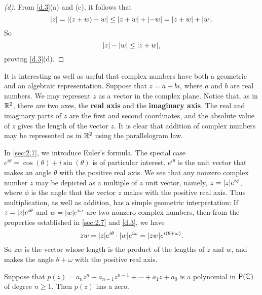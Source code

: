 \begin{proof}[(d)]
	From \cref{d.3}(a) and (c), it follows that
	\[
		\abs{z} = \abs{(z + w) - w} \leq \abs{z + w} + \abs{-w} = \abs{z + w} + \abs{w}.
	\]
	So
	\[
		\abs{z} - \abs{w} \leq \abs{z + w},
	\]
	proving \cref{d.3}(d).
\end{proof}

\begin{defn}\label{d.0.6}
	It is interesting as well as useful that complex numbers have both a geometric and an algebraic representation.
	Suppose that \(z = a + bi\), where \(a\) and \(b\) are real numbers.
	We may represent \(z\) as a vector in the complex plane.
	Notice that, as in \(\mathbb{R}^2\), there are two axes, the \textbf{real axis} and the \textbf{imaginary axis}.
	The real and imaginary parts of \(z\) are the first and second coordinates, and the absolute value of \(z\) gives the length of the vector \(z\).
	It is clear that addition of complex numbers may be represented as in \(\mathbb{R}^2\) using the parallelogram law.

	In \cref{sec:2.7}, we introduce Euler's formula.
	The special case \(e^{i \theta} = \cos(\theta) + i \sin(\theta)\) is of particular interest.
	\(e^{i \theta}\) is the unit vector that makes an angle \(\theta\) with the positive real axis.
	We see that any nonzero complex number \(z\) may be depicted as a multiple of a unit vector, namely, \(z = \abs{z} e^{i \phi}\), where \(\phi\) is the angle that the vector \(z\) makes with the positive real axis.
	Thus multiplication, as well as addition, has a simple geometric interpretation:
	If \(z = \abs{z} e^{i \theta}\) and \(w = \abs{w} e^{i \omega}\) are two nonzero complex numbers, then from the properties established in \cref{sec:2.7} and \cref{d.3}, we have
	\[
		zw = \abs{z} e^{i \theta} \cdot \abs{w} e^{i \omega} = \abs{zw} e^{i (\theta + \omega)}.
	\]
	So \(zw\) is the vector whose length is the product of the lengths of \(z\) and \(w\), and makes the angle \(\theta + \omega\) with the positive real axis.
\end{defn}

\begin{thm}\label{d.4}
	Suppose that \(p(z) = a_n z^n + a_{n - 1} z^{n - 1} + \cdots + a_1 z + a_0\) is a polynomial in \(\ps{\C}\) of degree \(n \geq 1\).
	Then \(p(z)\) has a zero.
\end{thm}

